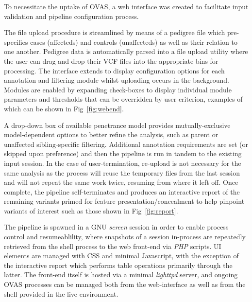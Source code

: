 \documentclass{bioinfo}
\def\app{OVAS}
\begin{document}
\begin{methods}
To necessitate the uptake of \app{}, a web interface was created to facilitate input validation and pipeline configuration process.

The file upload procedure is streamlined by means of a pedigree file which pre-specifies cases (affecteds) and controls (unaffecteds) as well as their relation to one another. Pedigree data is automatically parsed into a file upload utility where the user can drag and drop their VCF files into the appropriate bins for processing. The interface extends to display configuration options for each annotation and filtering module whilst uploading occurs in the background. Modules are enabled by expanding check-boxes to display individual module parameters and thresholds that can be overridden by user criterion, examples of which can be shown in Fig~\ref{fig:webend}. 

A drop-down box of available penetrance model provides mutually-exclusive model-dependent options to better refine the analysis, such as parent or unaffected sibling-specific filtering. Additional annotation requirements are set (or skipped upon preference) and then the pipeline is run in tandem to the existing input session. In the case of user-termination, re-upload is not necessary for the same analysis as the process will reuse the temporary files from the last session and will not repeat the same work twice, resuming from where it left off. Once complete, the pipeline self-terminates and produces an interactive report of the remaining variants primed for feature presentation/concealment to help pinpoint variants of interest such as those shown in Fig~\ref{fig:report}.

The pipeline is spawned in a GNU \textit{screen} session in order to enable process control and resumeablility, where snapshots of a session in-process are repeatedly retrieved from the shell process to the web front-end via \textit{PHP} scripts. UI elements are managed with CSS and minimal Javascript, with the exception of the interactive report which performs table operations primarily through the latter. The front-end itself is hosted via a minimal \textit{lighttpd} server, and ongoing \app{} processes can be managed both from the web-interface as well as from the shell provided in the live environment.


\end{methods}
\end{document}
